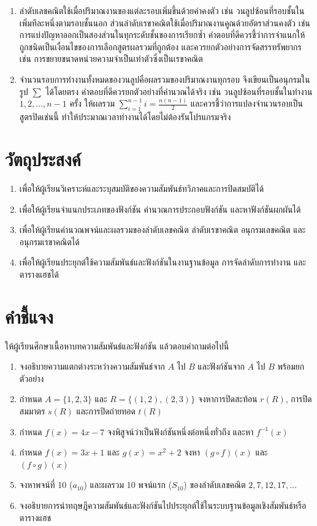 \begin{enumerate}
    \item ลำดับเลขคณิตใช้เมื่อปริมาณงานของแต่ละรอบเพิ่มขึ้นด้วยค่าคงตัว เช่น วนลูปซ้อนที่รอบชั้นในเพิ่มทีละหนึ่งตามรอบชั้นนอก ส่วนลำดับเรขาคณิตใช้เมื่อปริมาณงานคูณด้วยอัตราส่วนคงตัว เช่น การแบ่งปัญหาออกเป็นสองส่วนในทุกระดับชั้นของการเรียกซ้ำ คำตอบที่ดีควรชี้ว่าการจำแนกให้ถูกชนิดเป็นเงื่อนไขของการเลือกสูตรผลรวมที่ถูกต้อง และควรยกตัวอย่างการจัดสรรทรัพยากร เช่น การขยายขนาดหน่วยความจำเป็นเท่าตัวซึ่งเป็นเรขาคณิต

    \item จำนวนรอบการทำงานทั้งหมดของวนลูปคือผลรวมของปริมาณงานทุกรอบ จึงเขียนเป็นอนุกรมในรูป $\sum$ ได้โดยตรง คำตอบที่ดีควรยกตัวอย่างที่คำนวณได้จริง เช่น วนลูปซ้อนที่รอบชั้นในทำงาน $1, 2, \ldots, n-1$ ครั้ง ให้ผลรวม $\sum_{i=1}^{n-1} i = \frac{n(n-1)}{2}$ และควรชี้ว่าการแปลงจำนวนรอบเป็นสูตรปิดเช่นนี้ ทำให้ประมาณเวลาทำงานได้โดยไม่ต้องรันโปรแกรมจริง
\end{enumerate}

\newpage
{}
\section*{วัตถุประสงค์}
\begin{enumerate}
    \item เพื่อให้ผู้เรียนวิเคราะห์และระบุสมบัติของความสัมพันธ์ทวิภาคและการปิดสมบัติได้
    \item เพื่อให้ผู้เรียนจำแนกประเภทของฟังก์ชัน คำนวณการประกอบฟังก์ชัน และหาฟังก์ชันผกผันได้
    \item เพื่อให้ผู้เรียนคำนวณพจน์และผลรวมของลำดับเลขคณิต ลำดับเรขาคณิต อนุกรมเลขคณิต และอนุกรมเรขาคณิตได้
    \item เพื่อให้ผู้เรียนประยุกต์ใช้ความสัมพันธ์และฟังก์ชันในงานฐานข้อมูล การจัดลำดับการทำงาน และตารางแฮชได้
\end{enumerate}
\section*{คำชี้แจง} ให้ผู้เรียนศึกษาเนื้อหาบทความสัมพันธ์และฟังก์ชัน แล้วตอบคำถามต่อไปนี้

\begin{enumerate}
    \item จงอธิบายความแตกต่างระหว่างความสัมพันธ์จาก $A$ ไป $B$ และฟังก์ชันจาก $A$ ไป $B$ พร้อมยกตัวอย่าง
    \item กำหนด $A = \{1, 2, 3\}$ และ $R = \{(1,2), (2,3)\}$ จงหาการปิดสะท้อน $r(R)$, การปิดสมมาตร $s(R)$ และการปิดถ่ายทอด $t(R)$
    \item กำหนด $f(x) = 4x - 7$ จงพิสูจน์ว่าเป็นฟังก์ชันหนึ่งต่อหนึ่งทั่วถึง และหา $f^{-1}(x)$
    \item กำหนด $f(x) = 3x + 1$ และ $g(x) = x^2 + 2$ จงหา $(g \circ f)(x)$ และ $(f \circ g)(x)$
    \item จงหาพจน์ที่ 10 ($a_{10}$) และผลรวม 10 พจน์แรก ($S_{10}$) ของลำดับเลขคณิต $2, 7, 12, 17, \dots$
    \item จงอธิบายการนำทฤษฎีความสัมพันธ์และฟังก์ชันไปประยุกต์ใช้ในระบบฐานข้อมูลเชิงสัมพันธ์หรือตารางแฮช
\end{enumerate}
